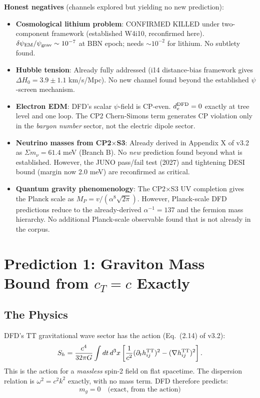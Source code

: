 \documentclass[11pt]{article}
\begin{document}
\noindent\textbf{Honest negatives} (channels explored but yielding no
new prediction):
\begin{itemize}
\item \textbf{Cosmological lithium problem}: CONFIRMED KILLED under
  two-component framework (established W4i10, reconfirmed here).
  $\delta\psi_{\rm EM}/\psi_{\rm grav} \sim 10^{-7}$ at BBN epoch;
  needs $\sim 10^{-2}$ for lithium.  No subtlety found.
\item \textbf{Hubble tension}: Already fully addressed (i14 distance-bias
  framework gives $\Delta H_0 = 3.9 \pm 1.1$ km/s/Mpc).  No new channel
  found beyond the established $\psi$-screen mechanism.
\item \textbf{Electron EDM}: DFD's scalar $\psi$-field is CP-even.
  $d_e^{\rm DFD} = 0$ exactly at tree level and one loop.  The CP2
  Chern-Simons term generates CP violation only in the \emph{baryon
  number} sector, not the electric dipole sector.
\item \textbf{Neutrino masses from CP2$\times$S3}: Already derived in
  Appendix X of v3.2 as $\Sigma m_\nu = 61.4$ meV (Branch B).
  No \emph{new} prediction found beyond what is established.  However,
  the JUNO pass/fail test (2027) and tightening DESI bound (margin now
  2.0 meV) are reconfirmed as critical.
\item \textbf{Quantum gravity phenomenology}: The CP2$\times$S3 UV
  completion gives the Planck scale as $M_P = v/(\alpha^8\sqrt{2\pi})$.
  However, Planck-scale DFD predictions reduce to the already-derived
  $\alpha^{-1} = 137$ and the fermion mass hierarchy.  No additional
  Planck-scale observable found that is not already in the corpus.
\end{itemize}

\section{Prediction 1: Graviton Mass Bound from $c_T = c$ Exactly}
\label{sec:graviton-mass}

\subsection{The Physics}

DFD's TT gravitational wave sector has the action (Eq.~(2.14) of v3.2):
\begin{equation}
S_h = \frac{c^4}{32\pi G}\int dt\,d^3x \left[
  \frac{1}{c^2}(\partial_t h_{ij}^{\rm TT})^2 - (\nabla h_{ij}^{\rm TT})^2
\right].
\end{equation}
This is the action for a \emph{massless} spin-2 field on flat spacetime.
The dispersion relation is $\omega^2 = c^2 k^2$ exactly, with no mass term.
DFD therefore predicts:
\begin{equation}
\boxed{m_g = 0 \quad\text{(exact, from the action)}}
\end{equation}
\end{document}
